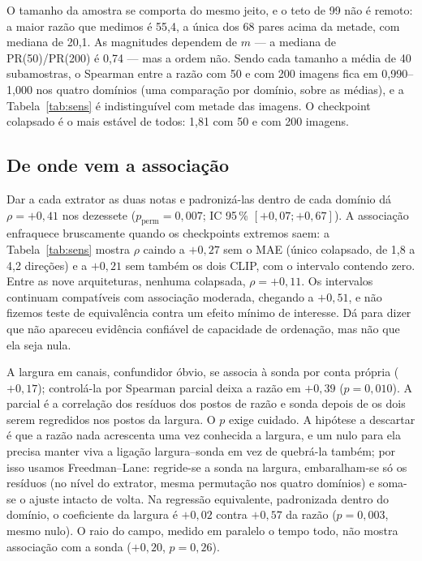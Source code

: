 \documentclass{esannV2}
\begin{document}
O tamanho da amostra se comporta do mesmo jeito, e o teto de 99 não é remoto: a
maior razão que medimos é 55,4, a única dos 68 pares acima da metade, com
mediana de 20,1. As magnitudes dependem de $m$ --- a mediana de PR(50)/PR(200)
é 0,74 --- mas a ordem não. Sendo cada tamanho a média de 40 subamostras, o
Spearman entre a razão com 50 e com 200 imagens fica em 0,990--1,000 nos quatro
domínios (uma comparação por domínio, sobre as médias), e a
Tabela~\ref{tab:sens} é indistinguível com metade das imagens. O checkpoint
colapsado é o mais estável de todos: 1,81 com 50 e com 200 imagens.

\subsection{De onde vem a associação}

Dar a cada extrator as duas notas e padronizá-las dentro de cada domínio dá
$\rho = +0{,}41$ nos dezessete ($p_{\text{perm}} = 0{,}007$; IC
95\,\% $[+0{,}07; +0{,}67]$). A associação enfraquece bruscamente quando os
checkpoints extremos saem: a Tabela~\ref{tab:sens} mostra $\rho$ caindo a $+0{,}27$ sem o MAE (único colapsado, de 1,8 a 4,2
direções) e a $+0{,}21$ sem também os dois CLIP, com o intervalo contendo zero. Entre as nove
arquiteturas, nenhuma colapsada, $\rho = +0{,}11$. Os intervalos continuam
compatíveis com associação moderada, chegando a $+0{,}51$, e não fizemos teste
de equivalência contra um efeito mínimo de interesse. Dá para dizer que não
apareceu evidência confiável de capacidade de ordenação, mas não que ela seja
nula.

A largura em canais, confundidor óbvio, se associa à sonda por conta própria
($+0{,}17$); controlá-la por Spearman parcial deixa a razão em $+0{,}39$
($p = 0{,}010$). A parcial é a correlação dos resíduos dos postos de razão e
sonda depois de os dois serem regredidos nos postos da largura. O $p$ exige
cuidado. A hipótese a descartar é que a razão nada acrescenta uma vez conhecida
a largura, e um nulo para ela precisa manter viva a ligação largura--sonda em
vez de quebrá-la também; por isso usamos Freedman--Lane: regride-se a sonda na
largura, embaralham-se só os resíduos (no nível do extrator, mesma permutação nos
quatro domínios) e soma-se o ajuste intacto de volta. Na regressão equivalente, padronizada dentro do domínio, o
coeficiente da largura é $+0{,}02$ contra $+0{,}57$ da razão ($p = 0{,}003$,
mesmo nulo). O raio do campo, medido em paralelo o tempo todo, não mostra
associação com a sonda ($+0{,}20$, $p = 0{,}26$).
\end{document}
